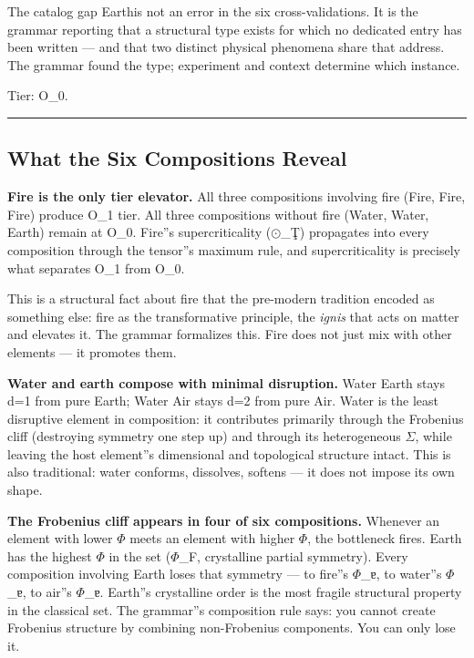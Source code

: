 \documentclass[12pt,a4paper]{article}
\begin{document}
The catalog gap Earth\otimesAir is not an error in the six cross-validations. It is the grammar reporting that a structural type exists for which no dedicated entry has been written --- and that two distinct physical phenomena share that address. The grammar found the type; experiment and context determine which instance.

Tier: O\_0.

\begin{center}
\rule{0.5\textwidth}{0.4pt}
\end{center}

\subsection{What the Six Compositions Reveal}

\textbf{Fire is the only tier elevator.} All three compositions involving fire (Fire\otimesWater, Fire\otimesEarth, Fire\otimesAir) produce O\_1 tier. All three compositions without fire (Water\otimesEarth, Water\otimesAir, Earth\otimesAir) remain at O\_0. Fire''s supercriticality ($\odot$\_Ţ) propagates into every composition through the tensor''s maximum rule, and supercriticality is precisely what separates O\_1 from O\_0.

This is a structural fact about fire that the pre-modern tradition encoded as something else: fire as the transformative principle, the \emph{ignis} that acts on matter and elevates it. The grammar formalizes this. Fire does not just mix with other elements --- it promotes them.

\textbf{Water and earth compose with minimal disruption.} Water \otimes Earth stays d=1 from pure Earth; Water \otimes Air stays d=2 from pure Air. Water is the least disruptive element in composition: it contributes primarily through the Frobenius cliff (destroying symmetry one step up) and through its heterogeneous $\Sigma$, while leaving the host element''s dimensional and topological structure intact. This is also traditional: water conforms, dissolves, softens --- it does not impose its own shape.

\textbf{The Frobenius cliff appears in four of six compositions.} Whenever an element with lower $\Phi$ meets an element with higher $\Phi$, the bottleneck fires. Earth has the highest $\Phi$ in the set ($\Phi$\_F, crystalline partial symmetry). Every composition involving Earth loses that symmetry --- to fire''s $\Phi$\_ɐ, to water''s $\Phi$\_ɐ, to air''s $\Phi$\_ɐ. Earth''s crystalline order is the most fragile structural property in the classical set. The grammar''s composition rule says: you cannot create Frobenius structure by combining non-Frobenius components. You can only lose it.
\end{document}
